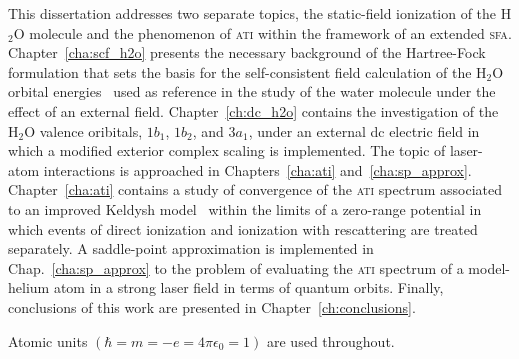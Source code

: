 
This dissertation addresses two separate topics, the static-field
ionization of the H$_{2}$O molecule and the phenomenon of \textsc{ati}
within the framework of an extended
\textsc{sfa}. Chapter~\ref{cha:scf_h2o} presents the necessary
background of the Hartree-Fock formulation that sets the basis for the
self-consistent field calculation of the H$_{2}$O orbital
energies~\cite{Moccia_1964} used as reference in the study of the
water molecule under the effect of an external
field. Chapter~\ref{ch:dc_h2o} contains the investigation of the
H$_{2}$O valence oribitals, $1b_{1}$, $1b_{2}$, and $3a_{1}$, under an
external dc electric field in which a modified exterior complex
scaling is implemented. The topic of laser-atom interactions is
approached in Chapters~\ref{cha:ati}
and~\ref{cha:sp_approx}. Chapter~\ref{cha:ati} contains a study of
convergence of the \textsc{ati} spectrum associated to an improved
Keldysh model~\cite{Kopold_1997sfa} within the limits of a zero-range
potential in which events of direct ionization and ionization with
rescattering are treated separately. A saddle-point approximation is
implemented in Chap.~\ref{cha:sp_approx} to the problem of evaluating
the \textsc{ati} spectrum of a model-helium atom in a strong laser
field in terms of quantum orbits. Finally, conclusions of this work
are presented in Chapter~\ref{ch:conclusions}.

Atomic units $(\hbar = m = -e = 4\pi\epsilon_{0} = 1)$ are used
throughout.
































